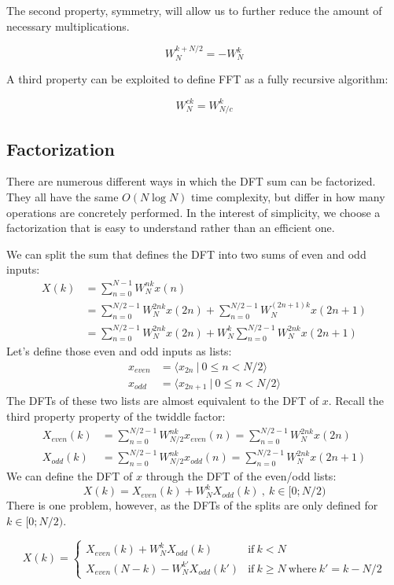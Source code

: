 The second property, symmetry,
will allow us to further reduce the amount of necessary multiplications.

\begin{equation}
    W^{k + N/2}_N = -W^k_N
\end{equation}

A third property can be exploited to define FFT as a fully recursive algorithm:

\begin{equation}
    W_N^{ck} = W_{N/c}^{k}
\end{equation}

\subsection{Factorization}

There are numerous different ways in which the DFT sum can be factorized.
They all have the same $O(N \log N)$ time complexity,
but differ in how many operations are concretely performed.
In the interest of simplicity,
we choose a factorization that is easy to understand rather than an efficient one.

We can split the sum that defines the DFT into two sums of even and odd inputs:
\begin{align}
    X(k) &= \sum_{n = 0}^{N - 1} W_N^{nk} x(n) \\
    &= \sum_{n = 0}^{N/2 - 1} W_N^{2nk} x(2n) + \sum_{n = 0}^{N/2 - 1} W_N^{(2n + 1)k} x(2n + 1) \\
    &= \sum_{n = 0}^{N/2 - 1} W_N^{2nk} x(2n) + W_N^k \sum_{n = 0}^{N/2 - 1} W_N^{2nk} x(2n + 1) %
\end{align}
Let's define those even and odd inputs as lists:
\begin{align}
    x_\textit{even} &= \langle x_{2n} ~|~ 0 \leq n < N/2 \rangle\\
    x_\textit{odd}  &= \langle x_{2n + 1} ~|~ 0 \leq n < N/2 \rangle
\end{align}
The DFTs of these two lists are almost equivalent to the DFT of $x$.
Recall the third property property of the twiddle factor:
\begin{align}
    X_\textit{even}(k) &= \sum_{n = 0}^{N/2 - 1} W_{N/2}^{nk} x_\textit{even}(n) = \sum_{n = 0}^{N/2 - 1} W_{N}^{2nk} x(2n) \\
    X_\textit{odd}(k) &= \sum_{n = 0}^{N/2 - 1} W_{N/2}^{nk} x_\textit{odd}(n) = \sum_{n = 0}^{N/2 - 1} W_{N}^{2nk} x(2n + 1)
\end{align}
We can define the DFT of $x$ through the DFT of the even/odd lists:
\begin{equation}
    X(k) = X_\textit{even}(k) + W_N^k X_\textit{odd}(k) ~,~ k \in [0;N/2)
\end{equation}
There is one problem, however,
as the DFTs of the splits are only defined for $k \in [0;N/2)$.

\begin{equation}
    X(k) =
    \begin{cases}
        X_\textit{even}(k) + W_N^k X_\textit{odd}(k) &\text{if}~k < N\\
        X_\textit{even}(N - k) - W_N^{k'} X_\textit{odd}(k') &\text{if}~k \geq N ~\text{where}~k' = k - N/2
    \end{cases}
\end{equation}
